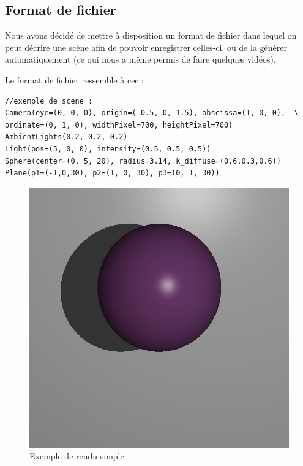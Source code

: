\documentclass[a4paper]{article}
\begin{document}
  \subsection{Format de fichier}
    Nous avons décidé de mettre à disposition un format de fichier dans lequel
    on peut décrire une scène afin de pouvoir enregistrer celles-ci, ou de la
    générer automatiquement (ce qui nous a même permis de faire quelques
    vidéos).

    Le format de fichier ressemble à ceci:
    \begin{lstlisting}[caption=Exemple de fichier associé à la figure
    \ref{fig:rendusimple}]
//exemple de scene :
Camera(eye=(0, 0, 0), origin=(-0.5, 0, 1.5), abscissa=(1, 0, 0),  \
ordinate=(0, 1, 0), widthPixel=700, heightPixel=700)
AmbientLights(0.2, 0.2, 0.2)
Light(pos=(5, 0, 0), intensity=(0.5, 0.5, 0.5))
Sphere(center=(0, 5, 20), radius=3.14, k_diffuse=(0.6,0.3,0.6))
Plane(p1=(-1,0,30), p2=(1, 0, 30), p3=(0, 1, 30))
    \end{lstlisting}

    \begin{figure}[p]
      \includegraphics[width=\textwidth]{livrables/tests/raytracer/fichier_simple.png}
      \caption{Exemple de rendu simple\label{fig:rendusimple}}
    \end{figure}
\end{document}
